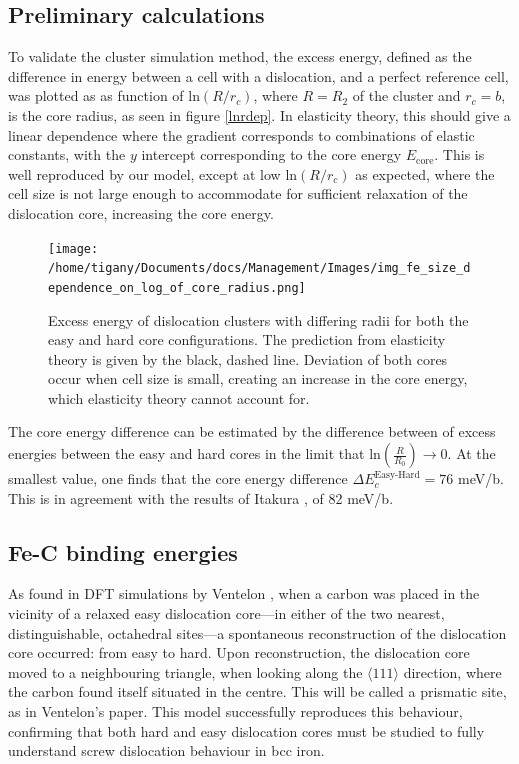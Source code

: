 \documentclass[a4paper,11pt]{article}
\begin{document}
\subsection{Preliminary calculations}
\label{sec:orge7c6175}


To validate the cluster simulation method, the excess energy, defined as the difference in energy
between a cell with a dislocation, and a perfect reference cell, was plotted as as function of
\(\text{ln}(R/r_c)\), where \(R = R_2\) of the cluster and \(r_c = b\), is the core radius, as seen in
figure \ref{lnrdep}. In elasticity theory, this should give a linear dependence where the gradient
corresponds to combinations of elastic constants, with the \(y\) intercept corresponding to the
core energy \(E_{\text{core}}\). This is well reproduced by our model, except at low \(\text{ln}(R/r_c)\)
as expected, where the cell size is not large enough to accommodate for sufficient relaxation of
the dislocation core, increasing the core energy.

\begin{figure}[htbp]
\centering
\texttt{[image: /home/tigany/Documents/docs/Management/Images/img\_fe\_size\_dependence\_on\_log\_of\_core\_radius.png]}
\caption{\label{fig:orgb5f24a8}
Excess energy of dislocation clusters with differing radii for both the easy and hard core configurations. The prediction from elasticity theory is given by the black, dashed line. Deviation of both cores occur when cell size is small, creating an increase in the core energy, which elasticity theory cannot account for.}
\end{figure}




The core energy difference can be estimated by the difference
between of excess energies between the easy and hard cores in the limit
that \(\text{ln}(\frac{R}{R_0}) \rightarrow 0\). At the smallest
value, one finds that the core energy difference \(\Delta
   E_c^{\text{Easy-Hard}} = 76\) meV/b. This is in agreement with the
results of Itakura \cite{Itakura2012}, of 82 meV/b.



\subsection{Fe-C binding energies}
\label{sec:org5591602}



As found in DFT simulations by Ventelon \cite{Ventelon2015}, when a carbon was placed in the
vicinity of a relaxed easy dislocation core---in either of the two nearest, distinguishable,
octahedral sites---a spontaneous reconstruction of the dislocation core occurred: from easy to
hard. Upon reconstruction, the dislocation core moved to a neighbouring triangle, when looking along the \(\langle
   111\rangle\) direction, where the carbon found itself situated in the centre. This will be called a
prismatic site, as in Ventelon's paper. This model successfully
reproduces this behaviour, confirming that both hard and easy dislocation cores must be studied
to fully understand screw dislocation behaviour in bcc iron. 
\end{document}
